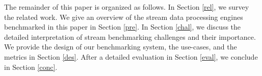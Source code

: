 The remainder of this paper is organized as follows. In Section \ref{rel}, we survey the related work. We give an overview of the stream data processing engines benchmarked in this paper in Section \ref{pre}. In Section \ref{chal}, we discuss the detailed interpretation of stream benchmarking challenges and their importance. We provide the design of our benchmarking system, the use-cases, and the metrics in Section \ref{des}. After a detailed evaluation in Section \ref{eval}, we conclude in Section \ref{conc}.

